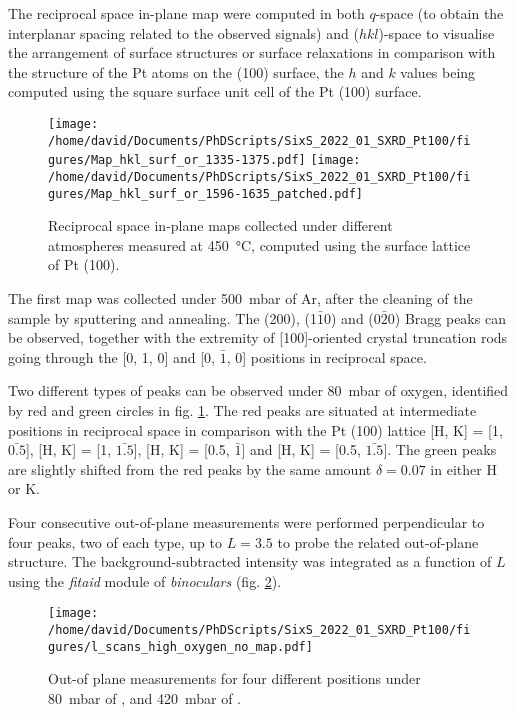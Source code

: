 The reciprocal space in-plane map were computed in both $q$-space (to obtain the interplanar spacing related to the observed signals) and ($hkl$)-space to visualise the arrangement of surface structures or surface relaxations in comparison with the structure of the Pt atoms on the (100) surface, the $h$ and $k$ values being computed using the square surface unit cell of the Pt (100) surface.

\begin{figure}[!htb]
    \centering
    \texttt{[image: /home/david/Documents/PhDScripts/SixS\_2022\_01\_SXRD\_Pt100/figures/Map\_hkl\_surf\_or\_1335-1375.pdf]}
    \texttt{[image: /home/david/Documents/PhDScripts/SixS\_2022\_01\_SXRD\_Pt100/figures/Map\_hkl\_surf\_or\_1596-1635\_patched.pdf]}
    \caption{
        Reciprocal space in-plane maps collected under different atmospheres measured at \qty{450}{\degreeCelsius}, computed using the surface lattice of Pt (100).
    }
    \label{fig:MapsPt100A}
\end{figure}

The first map was collected under \qty{500}{\milli\bar} of Ar, after the cleaning of the sample by sputtering and annealing.
The (200), (1$\bar{1}$0) and (0$\bar{2}$0) Bragg peaks can be observed, together with the extremity of [100]-oriented crystal truncation rods going through the [0, 1, 0] and [0, $\bar{1}$, 0] positions in reciprocal space.

Two different types of peaks can be observed under \qty{80}{\milli\bar} of oxygen, identified by red and green circles in fig. \ref{fig:MapsPt100A}.
The red peaks are situated at intermediate positions in reciprocal space in comparison with the Pt (100) lattice [H, K] = [1, $\bar{0.5}$], [H, K] = [1, $\bar{1.5}$], [H, K] = [0.5, $\bar{1}$] and [H, K] = [0.5, $\bar{1.5}$].
The green peaks are slightly shifted from the red peaks by the same amount $\delta = 0.07$ in either H or K.

Four consecutive out-of-plane measurements were performed perpendicular to four peaks, two of each type, up to $L=3.5$ to probe the related out-of-plane structure.
The background-subtracted intensity was integrated as a function of $L$ using the \textit{fitaid} module of \textit{binoculars} (fig. \ref{fig:LScansHighOxygenPt100}).

\begin{figure}[!htb]
    \centering
    \texttt{[image: /home/david/Documents/PhDScripts/SixS\_2022\_01\_SXRD\_Pt100/figures/l\_scans\_high\_oxygen\_no\_map.pdf]}
    \caption{
        Out-of plane measurements for four different positions under \qty{80}{\milli\bar} of , and \qty{420}{\milli\bar} of .
    }
    \label{fig:LScansHighOxygenPt100}
\end{figure}

